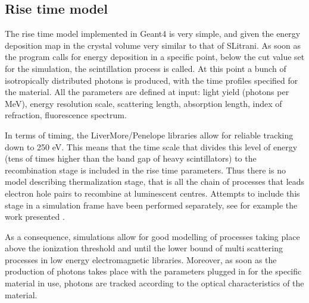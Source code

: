 \subsection{Rise time model}
The rise time model implemented in Geant4 is very simple, and given the energy deposition map in the crystal volume very similar to that of SLitrani. 
As soon as the program calls for energy deposition in a specific point, below the cut value set for the simulation, the scintillation process is called. 
At this point a bunch of isotropically distributed photons is produced, with the time profiles specified for the material.
All the parameters are defined at input: light yield (photons per MeV), energy resolution scale, scattering length, absorption length, index of refraction, fluorescence spectrum. 

In terms of timing, the LiverMore/Penelope libraries allow for reliable tracking down to 250 eV. This means that the time scale that divides this level of energy (tens of times higher than the band gap of heavy scintillators) to the recombination stage is included in the rise time parameters. Thus there is no model describing thermalization stage, that is all the chain of processes that leads electron hole pairs to recombine at luminescent centres. Attempts to include this stage in a simulation frame have been performed separately, see for example the work presented \cite{Vasiliev2013}.

As a consequence, simulations allow for good modelling of processes taking place above the ionization threshold and until the lower bound of multi scattering processes in low energy electromagnetic libraries. Moreover, as soon as the production of photons takes place with the parameters plugged in for the specific material in use, photons are tracked according to the optical characteristics of the material.

